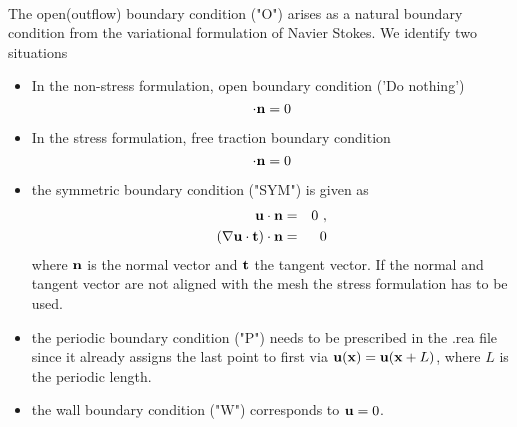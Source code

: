 \begin{comment}
\begin{table}
\begin{tabular}{ |l|l| }
   \hline
   Identifier & Description\\ \hline \hline
v  &      user defined Dirichlet velocity\\
t   &     user defined Dirichlet temperature\\
f    &    user defined flux\\
   \hline
\end{tabular}
\caption{User defined boundary conditions (flow velocity)}\label{tab:userBCf}
\end{table}
\end{comment}
\paragraph*{}
The open(outflow) boundary condition ("O") arises as a natural boundary condition from the variational formulation of Navier Stokes. We identify two situations
\begin{itemize}
\item In the non-stress formulation, open boundary condition ('Do nothing')
\begin{equation}
[-p\vect I + \nu(\nabla \vect u)]\cdot \vect n=0
\end{equation}
\item In the stress formulation, free traction boundary condition
\begin{equation}
[-p\vect I + \nu(\nabla \vect u+\nabla \vect u^T)]\cdot \vect n=0
\end{equation}

\item the symmetric boundary condition ("SYM") is given as
\begin{eqnarray}
\mathbf{u} \cdot \mathbf{n}&=&0\ ,\\
(\nabla \mathbf{u} \cdot \mathbf{t})\cdot \mathbf{n}&=&0
\end{eqnarray}
where \(\mathbf{n}\) is the normal vector and \(\mathbf{t}\) the tangent vector. If the normal and tangent vector are not aligned with the mesh the stress formulation has to be used.


\item the periodic boundary condition ("P") needs to be prescribed in the .rea file since it already assigns the last point to first via \(\mathbf{u}(\mathbf{x})=\mathbf{u}(\mathbf{x} + L) \), where \(L\) is the periodic length.

\item the wall boundary condition ("W") corresponds to \(\mathbf{u}=0\).
\end{itemize}


